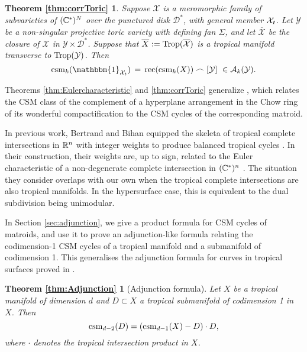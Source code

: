 \newtheorem*{thm:corrToric}{Theorem \ref{thm:corrToric}}
\begin{thm:corrToric}
Suppose $\mathcal{X}$ is a meromorphic family of subvarieties of $(\mathbb{C}^*)^N$ over the punctured disk $\mathcal{D}^*$, with general member ${\mathcal X}_t$. 
Let $\mathcal{Y}$ be a non-singular projective toric variety 
with defining fan $\Sigma$, and let $\overline{\mathcal{X}}$ be the closure of $\mathcal{X}$ in $\mathcal{Y} \times \mathcal{D}^*$. 
Suppose that $\overline{X} := \operatorname{Trop}(\overline{\mathcal{X}})$ is  a tropical manifold transverse to $\operatorname{Trop}(\mathcal{Y})$. Then
$$\csm_k( \mathbbm{1}_{\mathcal{X}_t}) \, = \, \rec(\csm_{k}(X)) \frown [\mathcal{Y}] 
\,\, \in \A_{k}(\mathcal{Y}).$$
\end{thm:corrToric}

Theorems \ref{thm:Eulercharacteristic} and \ref{thm:corrToric} generalize \cite[Theorem 3.1]{LdMRS}, which relates the CSM class of the complement of a hyperplane arrangement in the Chow ring of its wonderful compactification 
to the CSM cycles of the corresponding matroid. 

In previous work, 
Bertrand and Bihan equipped the skeleta of tropical complete intersections in $\mathbb{R}^n$ with integer weights 
to produce balanced tropical cycles \cite{BertrandBihan}.  
In their construction, their weights are, up to  sign, related to the Euler characteristic of a non-degenerate complete intersection 
in $({\mathbb C}^*)^n$ \cite[Theorem 5.9]{BertrandBihan}. 
The situation they consider overlaps with our own when the tropical complete intersections are also tropical manifolds. In the hypersurface case, this is equivalent to the dual subdivision being unimodular. 

In Section \ref{sec:adjunction}, we give a product formula for CSM cycles of matroids, and use it to prove an adjunction-like formula relating the codimension-1 CSM cycles of a tropical manifold and a submanifold of codimension 1. This generalises the adjunction formula for curves in tropical surfaces proved in \cite[Theorem 6]{Shaw:Surf}.

\newtheorem*{thm:Adjunction}{Theorem \ref{thm:Adjunction}}
\begin{thm:Adjunction}[Adjunction formula]
Let $X$ be a tropical manifold  of dimension $d$ and $D \subset X$ a tropical submanifold of codimension 1 in $X$. 
Then 
$$\operatorname{csm}_{d-2}(D) = (\operatorname{csm}_{d-1}(X) -  D )\cdot D,$$
where $\cdot$ denotes the tropical intersection product in $X$. 
\end{thm:Adjunction}

